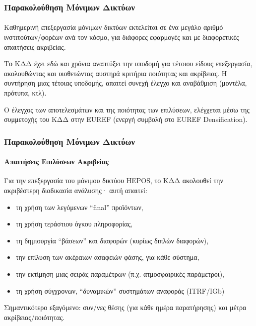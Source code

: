 \begin{frame}
  \frametitle{Παρακολούθηση Μόνιμων Δικτύων}
  \framesubtitle{}
  \label{}

    Καθημερινή επεξεργασία μόνιμων δικτύων εκτελείται σε ένα μεγάλο αριθμό ινστιτούτων/φορέων ανά τον κόσμο,
    για διάφορες εφαρμογές και με διαφορετικές απαιτήσεις ακριβείας.
    \vspace{0.3cm}

    Το ΚΔΔ έχει εδώ και χρόνια αναπτύξει την υποδομή για τέτοιου είδους επεξεργασία, ακολουθώντας και υιοθετώντας
    αυστηρά κριτήρια ποιότητας και ακρίβειας. Η συντήρηση μιας τέτοιας υποδομής, απαιτεί συνεχή έλεγχο και
    αναβάθμιση (μοντέλα, πρότυπα, κτλ).
    \vspace{0.3cm}

    Ο έλεγχος των αποτελεσμάτων και της ποιότητας των επιλύσεων, ελέγχεται μέσω της συμμετοχής του ΚΔΔ στην EUREF
    (ενεργή συμβολή στο EUREF Densification).
\end{frame}
\note{}

\begin{frame}
  \frametitle{Παρακολούθηση Μόνιμων Δικτύων}
  \framesubtitle{Απαιτήσεις Επιλύσεων Ακριβείας}
  \label{}

    Για την επεξεργασία του μόνιμου δικτύου HEPOS, το ΚΔΔ ακολουθεί την ακριβέστερη διαδικασία
    ανάλυσης· αυτή απαιτεί:
    \begin{itemize}
        \item τη χρήση των λεγόμενων ``final'' προϊόντων,
        \item τη χρήση τεράστιου όγκου πληροφορίας,
        \item τη δημιουργία ``βάσεων'' και διαφορών (κυρίως διπλών διαφορών),
        \item την επίλυση των ακέραιων ασαφειών φάσης, για κάθε σύστημα,
        \item την εκτίμηση μιας σειράς παραμέτρων (π.χ. ατμοσφαιρικές παράμετροι),
        \item τη χρήση σύγχρονων, ``δυναμικών'' συστημάτων αναφοράς (ITRF/IGb)
    \end{itemize}
    \vspace{0.3cm}

    Σημαντικότερο εξαγόμενο: συν/νες θέσης (για κάθε ημέρα παρατήρησης) και μέτρα ακρίβειας/ποιότητας.
\end{frame}
\note{}

